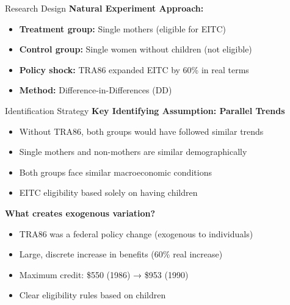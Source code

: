 \documentclass[aspectratio=169]{beamer}
\begin{document}
\begin{frame}{Research Design}
\textbf{Natural Experiment Approach:}
\begin{itemize}
    \item \textbf{Treatment group:} Single mothers (eligible for EITC)
    \item \textbf{Control group:} Single women without children (not eligible)
    \item \textbf{Policy shock:} TRA86 expanded EITC by 60\% in real terms
    \item \textbf{Method:} Difference-in-Differences (DD)
\end{itemize}

\vspace{0.5cm}
\begin{center}
\end{center}
\end{frame}

\begin{frame}{Identification Strategy}
\textbf{Key Identifying Assumption: Parallel Trends}
\begin{itemize}
    \item Without TRA86, both groups would have followed similar trends
    \item Single mothers and non-mothers are similar demographically
    \item Both groups face similar macroeconomic conditions
    \item EITC eligibility based solely on having children
\end{itemize}

\vspace{0.5cm}
\textbf{What creates exogenous variation?}
\begin{itemize}
    \item TRA86 was a federal policy change (exogenous to individuals)
    \item Large, discrete increase in benefits (60\% real increase)
    \item Maximum credit: \$550 (1986) → \$953 (1990)
    \item Clear eligibility rules based on children
\end{itemize}
\end{frame}
\end{document}
